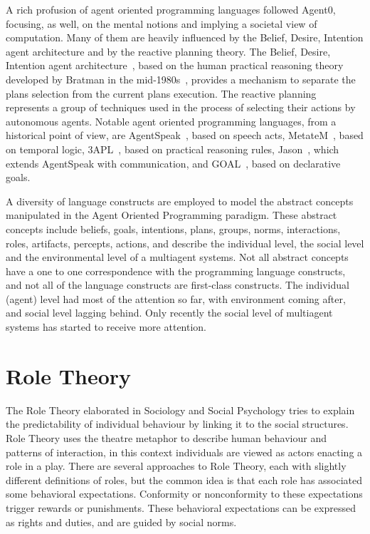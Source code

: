 \documentclass[a4paper,12pt,oneside,fleqn]{book} %
\begin{document}
A rich profusion of agent oriented programming languages followed Agent0,
focusing, as well, on the mental notions and implying a societal view of
computation.  Many of them are heavily influenced by the Belief, Desire,
Intention agent architecture and by the reactive planning theory.  The
Belief, Desire, Intention agent architecture~\cite{DBLP:conf/icmas/RaoG95},
based on the human practical reasoning theory developed by Bratman in the
mid-1980s~\cite{Bratman:1999}, provides a mechanism to separate the plans
selection from the current plans execution.  The reactive
planning~\cite{DBLP:conf/aaai/GeorgeffL87} represents a group of techniques
used in the process of selecting their actions by autonomous agents.
Notable agent oriented programming languages, from a historical point of
view, are AgentSpeak~\cite{DBLP:conf/maamaw/Rao96}, based on speech acts,
MetateM~\cite{DBLP:conf/promas/Fisher05}, based on temporal logic,
3APL~\cite{DBLP:conf/promas/DastaniRDM03}, based on practical reasoning
rules, Jason~\cite{DBLP:books/sp/map2005/BordiniHV05}, which extends
AgentSpeak with communication, and
GOAL~\cite{DBLP:journals/corr/cs-AI-0207008}, based on declarative goals.

A diversity of language constructs are employed to model the abstract
concepts manipulated in the Agent Oriented Programming paradigm. These
abstract concepts include beliefs, goals, intentions, plans, groups, norms,
interactions, roles, artifacts, percepts, actions, and describe the
individual level, the social level and the environmental level of a
multiagent systems. Not all abstract concepts have a one to one
correspondence with the programming language constructs, and not all of the
language constructs are first-class constructs. The individual (agent) level
had most of the attention so far, with environment coming after, and social
level lagging behind. Only recently the social level of multiagent systems
has started to receive more attention.

\section{Role Theory} %

The Role Theory elaborated in Sociology and Social Psychology tries to
explain the predictability of individual behaviour by linking it to the
social structures. Role Theory uses the theatre metaphor to describe human
behaviour and patterns of interaction, in this context individuals are
viewed as actors enacting a role in a play. There are several approaches to
Role Theory, each with slightly different definitions of roles, but the
common idea is that each role has associated some behavioral expectations.
Conformity or nonconformity to these expectations trigger rewards or
punishments. These behavioral expectations can be expressed as rights and
duties, and are guided by social norms.
\end{document}
